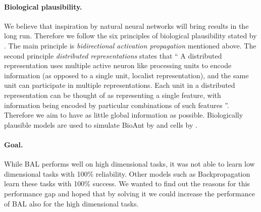 \paragraph{Biological plausibility.} We believe that inspiration by natural neural networks will bring results in the long run. Therefore we follow the six principles of biological plausibility stated by \citet{hinton1988learning}. The main principle is \emph{bidirectional activation propagation} mentioned above. The second principle \emph{distributed representations} states that \enquote{
  A distributed representation uses multiple active neuron like processing units to encode information (as opposed to a single unit, localist representation), and the same unit can participate in multiple representations. Each unit in a distributed representation can be thought of as representing a single feature, with information being encoded by particular combinations of such features \citep[pp.~ 456]{o1998six}
}. Therefore we aim to have as little global information as possible. Biologically plausible models are used to simulate BioAnt by \citet{schneider2009application} and cells by \citet{nawrocki2012monitoring}. 

\paragraph{Goal.}
While BAL performs well on high dimensional tasks, it was not able to learn low dimensional tasks with 100\% reliability. Other models such as Backpropagation \citep{rumelhart1986learning} learn these tasks with 100\% success. We wanted to find out the reasons for this performance gap and hoped that by solving it we could increase the performance of BAL also for the high dimensional tasks. 



